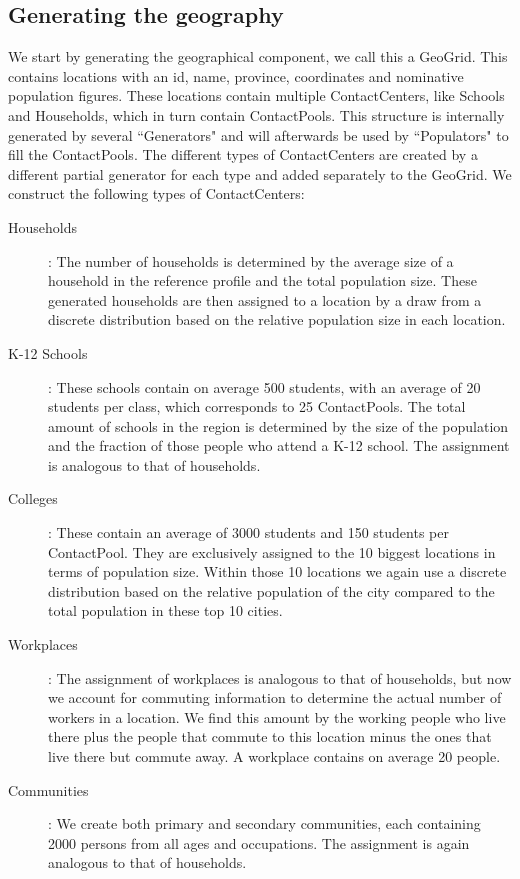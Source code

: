 \subsection{Generating the geography}
\label{subsection:gengeo}
We start by generating the geographical component, we call this a GeoGrid.
This contains locations with an id, name, province, coordinates and nominative population figures.
These locations contain multiple ContactCenters, like Schools and Households, which in turn contain ContactPools.
This structure is internally generated by several ``Generators" and will afterwards be used by ``Populators" to fill the ContactPools.
The different types of ContactCenters are created by a different partial generator for each type and added separately to the GeoGrid.
We construct the following types of ContactCenters:

\begin{description}
    \item[Households]:
        The number of households is determined by the average size of a household in the reference profile and the total population size.
        These generated households are then assigned to a location by a draw from a discrete distribution based on the relative population size in each location.
    \item[K-12 Schools]:
        These schools contain on average 500 students, with an average of 20 students per class, which corresponds to 25 ContactPools.
        The total amount of schools in the region is determined by the size of the population and the fraction of those people who attend a K-12 school.
        The assignment is analogous to that of households.
    \item[Colleges]:
        These contain an average of 3000 students and 150 students per ContactPool.
        They are exclusively assigned to the 10 biggest locations in terms of population size.
        Within those 10 locations we again use a discrete distribution based on the relative population of the city compared to the total population in these top 10 cities.
    \item[Workplaces]:
        The assignment of workplaces is analogous to that of households, but now we account for commuting information to determine the actual number of workers in a location.
        We find this amount by the working people who live there plus the people that commute to this location minus the ones that live there but commute away.
        A workplace contains on average 20 people.
    \item[Communities]:
        We create both primary and secondary communities, each containing 2000 persons from all ages and occupations.
        The assignment is again analogous to that of households.
\end{description}

